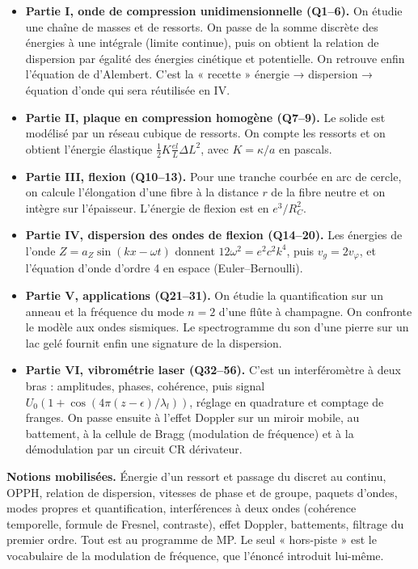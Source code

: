 \documentclass[11pt,a4paper]{article}
\providecommand{\tightlist}{\setlength{\itemsep}{0pt}\setlength{\parskip}{0pt}}
\begin{document}
\begin{itemize}
\tightlist
\item
  \textbf{Partie I, onde de compression unidimensionnelle (Q1--6).} On étudie une chaîne de masses et de ressorts. On passe de la somme discrète des énergies à une intégrale (limite continue), puis on obtient la relation de dispersion par égalité des énergies cinétique et potentielle. On retrouve enfin l'équation de d'Alembert. C'est la « recette » énergie → dispersion → équation d'onde qui sera réutilisée en IV.
\item
  \textbf{Partie II, plaque en compression homogène (Q7--9).} Le solide est modélisé par un réseau cubique de ressorts. On compte les ressorts et on obtient l'énergie élastique \(\frac12K\frac{el}{L}\Delta L^2\), avec \(K=\kappa/a\) en pascals.
\item
  \textbf{Partie III, flexion (Q10--13).} Pour une tranche courbée en arc de cercle, on calcule l'élongation d'une fibre à la distance \(r\) de la fibre neutre et on intègre sur l'épaisseur. L'énergie de flexion est en \(e^3/R_C^2\).
\item
  \textbf{Partie IV, dispersion des ondes de flexion (Q14--20).} Les énergies de l'onde \(Z=a_Z\sin(kx-\omega t)\) donnent \(12\omega^2=e^2c^2k^4\), puis \(v_g=2v_\varphi\), et l'équation d'onde d'ordre 4 en espace (Euler--Bernoulli).
\item
  \textbf{Partie V, applications (Q21--31).} On étudie la quantification sur un anneau et la fréquence du mode \(n=2\) d'une flûte à champagne. On confronte le modèle aux ondes sismiques. Le spectrogramme du son d'une pierre sur un lac gelé fournit enfin une signature de la dispersion.
\item
  \textbf{Partie VI, vibrométrie laser (Q32--56).} C'est un interféromètre à deux bras : amplitudes, phases, cohérence, puis signal \(U_0\left(1+\cos(4\pi(z-\epsilon)/\lambda_l)\right)\), réglage en quadrature et comptage de franges. On passe ensuite à l'effet Doppler sur un miroir mobile, au battement, à la cellule de Bragg (modulation de fréquence) et à la démodulation par un circuit CR dérivateur.
\end{itemize}

\textbf{Notions mobilisées.} Énergie d'un ressort et passage du discret au continu, OPPH, relation de dispersion, vitesses de phase et de groupe, paquets d'ondes, modes propres et quantification, interférences à deux ondes (cohérence temporelle, formule de Fresnel, contraste), effet Doppler, battements, filtrage du premier ordre. Tout est au programme de MP. Le seul « hors-piste » est le vocabulaire de la modulation de fréquence, que l'énoncé introduit lui-même.
\end{document}
